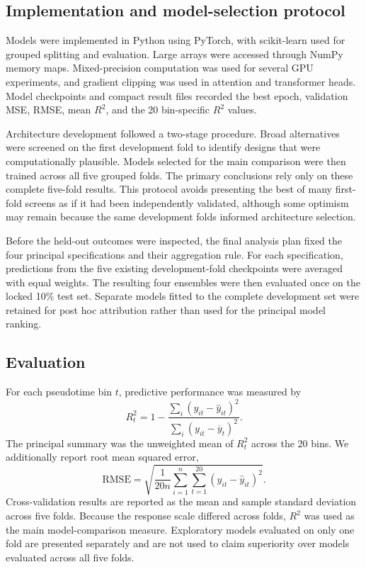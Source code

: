 \documentclass[a4paper,12pt]{article}
\begin{document}
\subsection{Implementation and model-selection protocol}

Models were implemented in Python using PyTorch, with scikit-learn used for grouped splitting and evaluation. Large arrays were accessed through NumPy memory maps. Mixed-precision computation was used for several GPU experiments, and gradient clipping was used in attention and transformer heads. Model checkpoints and compact result files recorded the best epoch, validation MSE, RMSE, mean $R^2$, and the 20 bin-specific $R^2$ values.

Architecture development followed a two-stage procedure. Broad alternatives were screened on the first development fold to identify designs that were computationally plausible. Models selected for the main comparison were then trained across all five grouped folds. The primary conclusions rely only on these complete five-fold results. This protocol avoids presenting the best of many first-fold screens as if it had been independently validated, although some optimism may remain because the same development folds informed architecture selection.

Before the held-out outcomes were inspected, the final analysis plan fixed the four principal specifications and their aggregation rule. For each specification, predictions from the five existing development-fold checkpoints were averaged with equal weights. The resulting four ensembles were then evaluated once on the locked 10\% test set. Separate models fitted to the complete development set were retained for post hoc attribution rather than used for the principal model ranking.

\subsection{Evaluation}

For each pseudotime bin $t$, predictive performance was measured by
\[
R_t^2=1-\frac{\sum_i(y_{it}-\widehat y_{it})^2}
{\sum_i(y_{it}-\overline y_t)^2}.
\]
The principal summary was the unweighted mean of $R_t^2$ across the 20 bins. We additionally report root mean squared error,
\[
\mathrm{RMSE}=\sqrt{\frac{1}{20n}\sum_{i=1}^{n}\sum_{t=1}^{20}
(y_{it}-\widehat y_{it})^2}.
\]
Cross-validation results are reported as the mean and sample standard deviation across five folds. Because the response scale differed across folds, $R^2$ was used as the main model-comparison measure. Exploratory models evaluated on only one fold are presented separately and are not used to claim superiority over models evaluated across all five folds.
\end{document}
